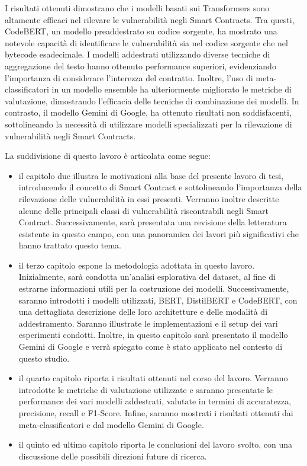 \documentclass[../../Thesis.tex]{subfiles}
\begin{document}
I risultati ottenuti dimostrano che i modelli basati sui Transformers sono altamente efficaci nel rilevare le vulnerabilit\`a negli Smart Contracts. Tra questi, CodeBERT, un modello preaddestrato su codice sorgente, ha mostrato una notevole capacit\`a di identificare le vulnerabilit\`a sia nel codice sorgente che nel bytecode esadecimale. I modelli addestrati utilizzando diverse tecniche di aggregazione del testo hanno ottenuto performance superiori, evidenziando l'importanza di considerare l'interezza del contratto. Inoltre, l'uso di meta-classificatori in un modello ensemble ha ulteriormente migliorato le metriche di valutazione, dimostrando l'efficacia delle tecniche di combinazione dei modelli. In contrasto, il modello Gemini di Google, ha ottenuto risultati non soddisfacenti, sottolineando la necessit\`a di utilizzare modelli specializzati per la rilevazione di vulnerabilit\`a negli Smart Contracts.

La suddivisione di questo lavoro \`e articolata come segue:
\begin{itemize}
    \item il capitolo due illustra le motivazioni alla base del presente lavoro di tesi, introducendo il concetto di Smart Contract e sottolineando l'importanza della rilevazione delle vulnerabilit\`a in essi presenti. Verranno inoltre descritte alcune delle principali classi di vulnerabilit\`a riscontrabili negli Smart Contract. Successivamente, sar\`a presentata una revisione della letteratura esistente in questo campo, con una panoramica dei lavori pi\`u significativi che hanno trattato questo tema.
    \item il terzo capitolo espone la metodologia adottata in questo lavoro. Inizialmente, sar\`a condotta un'analisi esplorativa del dataset, al fine di estrarne informazioni utili per la costruzione dei modelli.  
    Successivamente, saranno introdotti i modelli utilizzati, BERT, DistilBERT e CodeBERT, con una dettagliata descrizione delle loro architetture e delle modalit\`a di addestramento. Saranno illustrate le implementazioni e il setup dei vari esperimenti condotti. Inoltre, in questo capitolo sar\`a presentato il modello Gemini di Google e verr\`a spiegato come \`e stato applicato nel contesto di questo studio.
    \item il quarto capitolo riporta i risultati ottenuti nel corso del lavoro. Verranno introdotte le metriche di valutazione utilizzate e saranno presentate le performance dei vari modelli addestrati, valutate in termini di accuratezza, precisione, recall e F1-Score. Infine, saranno mostrati i risultati ottenuti dai meta-classificatori e dal modello Gemini di Google.
    \item il quinto ed ultimo capitolo riporta le conclusioni del lavoro svolto, con una discussione  delle possibili direzioni future di ricerca.     
\end{itemize}
\end{document}
